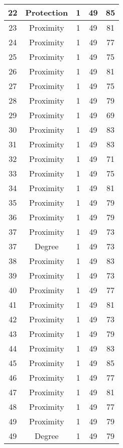 \documentclass[results.tex]{subfiles}
\begin{document}
\begin{center}
\begin{tabular}{| c || c | c | c | c |}
    \hline
    22 & Protection & 1 & 49 & 85 \\ 
    \hline
    23 & Proximity & 1 & 49 & 81 \\ 
    \hline
    24 & Proximity & 1 & 49 & 77 \\ 
    \hline
    25 & Proximity & 1 & 49 & 75 \\ 
    \hline
    26 & Proximity & 1 & 49 & 81 \\ 
    \hline
    27 & Proximity & 1 & 49 & 75 \\ 
    \hline
    28 & Proximity & 1 & 49 & 79 \\ 
    \hline
    29 & Proximity & 1 & 49 & 69 \\ 
    \hline
    30 & Proximity & 1 & 49 & 83 \\ 
    \hline
    31 & Proximity & 1 & 49 & 83 \\ 
    \hline
    32 & Proximity & 1 & 49 & 71 \\ 
    \hline
    33 & Proximity & 1 & 49 & 75 \\ 
    \hline
    34 & Proximity & 1 & 49 & 81 \\ 
    \hline
    35 & Proximity & 1 & 49 & 79 \\ 
    \hline
    36 & Proximity & 1 & 49 & 79 \\ 
    \hline
    37 & Proximity & 1 & 49 & 73 \\ 
    \hline
    37 & Degree & 1 & 49 & 73 \\ 
    \hline
    38 & Proximity & 1 & 49 & 83 \\ 
    \hline
    39 & Proximity & 1 & 49 & 73 \\ 
    \hline
    40 & Proximity & 1 & 49 & 77 \\ 
    \hline
    41 & Proximity & 1 & 49 & 81 \\ 
    \hline
    42 & Proximity & 1 & 49 & 73 \\ 
    \hline
    43 & Proximity & 1 & 49 & 79 \\ 
    \hline
    44 & Proximity & 1 & 49 & 83 \\ 
    \hline
    45 & Proximity & 1 & 49 & 85 \\ 
    \hline
    46 & Proximity & 1 & 49 & 77 \\ 
    \hline
    47 & Proximity & 1 & 49 & 81 \\ 
    \hline
    48 & Proximity & 1 & 49 & 77 \\ 
    \hline
    49 & Proximity & 1 & 49 & 79 \\ 
    \hline
    49 & Degree & 1 & 49 & 79 \\ 
    \hline   \end{tabular}
\end{center}
\end{document}
